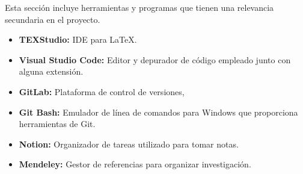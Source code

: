 Esta sección incluye herramientas y programas que tienen una relevancia secundaria en el proyecto.

\begin{itemize}

\item \textbf{TEXStudio:} IDE para LaTeX.

\item \textbf{Visual Studio Code:} Editor y depurador de código empleado junto con alguna extensión.

\item \textbf{GitLab:} Plataforma de control de versiones,

\item \textbf{Git Bash:} Emulador de línea de comandos para Windows que proporciona herramientas de Git.

\item \textbf{Notion:} Organizador de tareas utilizado para tomar notas.

\item \textbf{Mendeley:} Gestor de referencias para organizar investigación.

\end{itemize}












